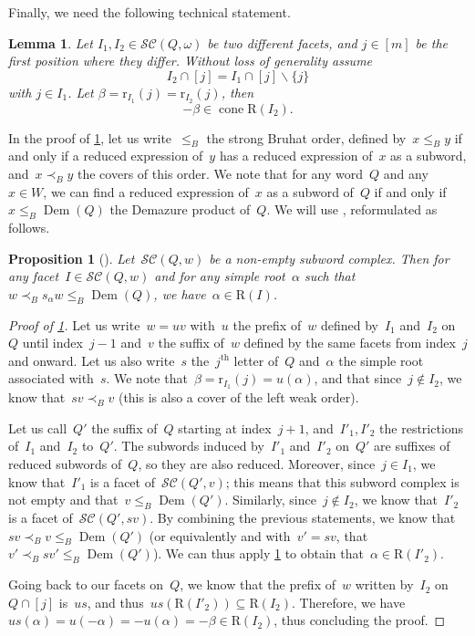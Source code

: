 \documentclass[reqno]{amsart}
\newtheorem{proposition}[theorem]{Proposition}
\newtheorem{lemma}[theorem]{Lemma}
\theoremstyle{definition}
\newcommand{\ssm}{\smallsetminus} %
\DeclareMathOperator{\cone}{cone} %
\DeclareMathOperator{\DemazureProduct}{Dem} %
\newcommand{\subwordComplex}{\mathcal{SC}} %
\newcommand{\Roots}{\mathrm{R}} %
\newcommand{\rootFunction}[2]{\mathrm{r}_{#1}(#2)} %
\begin{document}
Finally, we need the following technical statement.

\begin{lemma}
\label{lem:sweeping3}
Let $I_1,I_2\in \subwordComplex(Q,\omega)$ be two different facets, and $j\in [m]$ be the first position where they differ.
Without loss of generality assume 
\[
I_2\cap [j] = I_1\cap [j] \ssm \{j\}
\]
with $j\in I_1$.
Let $\beta=\rootFunction{I_1}{j}=\rootFunction{I_2}{j}$, then 
\[
-\beta \in \cone \Roots(I_2).
\]
\end{lemma}

In the proof of \cref{lem:sweeping3}, let us write~$\leqslant_B$ the strong Bruhat order, defined by~$x \leqslant_B y$ if and only if a reduced expression of~$y$ has a reduced expression of~$x$ as a subword, and~$x \prec_B y$ the covers of this order. We note that for any word~$Q$ and any~$x\in W$, we can find a reduced expression of~$x$ as a subword of~$Q$ if and only if~$x \leqslant_B \DemazureProduct(Q)$ the Demazure product of~$Q$.
We will use \cite[Proposition 3.14]{JahnStump}, reformulated as follows.

\begin{proposition}[\cite{JahnStump}]\label{prop:JSDemazureCone}
Let~$\subwordComplex(Q,w)$ be a non-empty subword complex. Then for any facet~$I \in \subwordComplex(Q,w)$ and for any simple root~$\alpha$ such that~$w \prec_B s_\alpha w \leqslant_B \DemazureProduct(Q)$, we have~$\alpha \in \Roots(I)$.
\end{proposition}

\begin{proof}[Proof of \cref{lem:sweeping3}]
Let us write~$w = uv$ with~$u$ the prefix of~$w$ defined by~$I_1$ and~$I_2$ on~$Q$ until index~$j-1$ and~$v$ the suffix of~$w$ defined by the same facets from index~$j$ and onward. Let us also write~$s$ the~$j^{\text{th}}$ letter of~$Q$ and~$\alpha$ the simple root associated with~$s$. We note that~$\beta = \rootFunction{I_1}{j} = u(\alpha)$, and that since~$j \notin I_2$, we know that~$sv \prec_B v$ (this is also a cover of the left weak order).

Let us call~$Q'$ the suffix of~$Q$ starting at index~$j+1$, and~$I'_1,I'_2$ the restrictions of~$I_1$ and~$I_2$ to~$Q'$. The subwords induced by~$I'_1$ and~$I'_2$ on~$Q'$ are suffixes of reduced subwords of~$Q$, so they are also reduced. Moreover, since~$j \in I_1$, we know that~$I'_1$ is a facet of~$\subwordComplex(Q',v)$; this means that this subword complex is not empty and that~$v \leqslant_B \DemazureProduct(Q')$. Similarly, since~$j \notin I_2$, we know that~$I'_2$ is a facet of~$\subwordComplex(Q',sv)$. By combining the previous statements, we know that~$sv \prec_B v \leqslant_B \DemazureProduct(Q')$ (or equivalently and with~$v' = sv$, that~$v' \prec_B sv' \leqslant_B \DemazureProduct(Q')$). We can thus apply \cref{prop:JSDemazureCone} to obtain that~$\alpha \in \Roots(I'_2)$.

Going back to our facets on~$Q$, we know that the prefix of~$w$ written by~$I_2$ on~$Q \cap [j]$ is~$us$, and thus~$us(\Roots(I'_2)) \subseteq \Roots(I_2)$. Therefore, we have~$us(\alpha) = u(-\alpha) = -u(\alpha) = -\beta \in \Roots(I_2)$, thus concluding the proof.
\end{proof}
\end{document}
